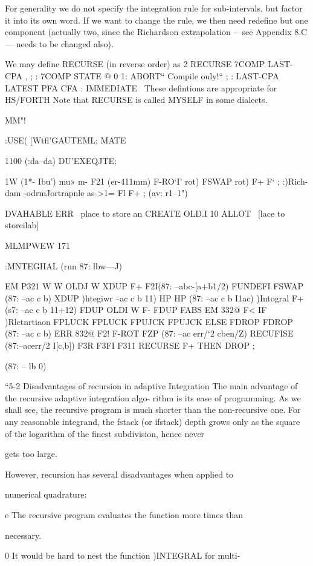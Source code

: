 For generality we do not specify the integration rule for sub-intervals, but factor it into its own
word. If we want to change the rule, we then need redeﬁne but one component (actually two,
since the Richardson extrapolation —see Appendix 8.C— needs to be changed also).

We may deﬁne RECURSE (in reverse order) as
2 RECURSE 7COMP LAST-CPA , ;
: 7COMP STATE @ 0 1: ABORT“ Compile only!“ ;
: LAST-CPA LATEST PFA CFA : IMMEDIATE
\ These defintions are appropriate for HS/FORTH
Note that RECURSE is called MYSELF in some dialects.

 

MM"!

:USE( [Wtﬂ'GAUTEML;
MATE

1100 (:da--da) DU’EXEQJTE;

1W (1*- Ibu')
\taumpuoudm
mu» m- F21 (er-411mm)
F-RO‘I’ rot) FSWAP rot) F+ F‘ ;
:)Rich-dam \R-odrmJortrapnle
as->1= Fl F+ ; (av: r1--1")

DVAHABLE ERR \ place to store an
CREATE OLD.I 10 ALLOT
\ [lace to storeilab]

 

MLMPWEW 171

:MNTEGHAL (run 87: lbw—J)

EM P321
W W
OLDJ W
XDUP F+ F2I(87: --abc-[a+b1/2)
FUNDEFI FSWAP (87: --ac c b)
XDUP )htegiwr --ac c b 11)
HP HP (87: --ac c b I1ac)
)Intogral F+ (s7: --ac c b 11+12)
FDUP OLDI W F-
FDUP FABS EM 332@ F<
IF )Rlctnrtiaon
FPLUCK FPLUCK FPUJCK FPUJCK
ELSE FDROP FDROP (87: --ac c b)
ERR 832@ F2!
F-ROT FZP (87: --ac err/‘2 cben/Z)
RECUFISE (87:--acerr/2 I[c,b])
F3R F3FI F311 RECURSE F+
THEN DROP ;

(87: -- lb 0)

“5-2 Disadvantages of recursion in adaptive Integration
The main advantage of the recursive adaptive integration algo-
rithm is its ease of programming. As we shall see, the recursive
program is much shorter than the non-recursive one. For any
reasonable integrand, the fstack (or ifstack) depth grows only as
the square of the logarithm of the ﬁnest subdivision, hence never

gets too large.

However, recursion has several disadvantages when applied to

numerical quadrature:

e The recursive program evaluates the function more times than

necessary.

0 It would be hard to nest the function )INTEGRAL for multi-

